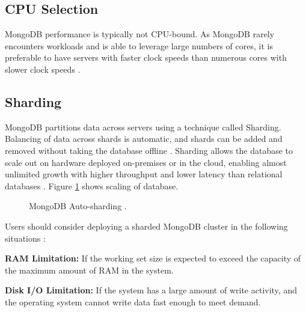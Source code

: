 \documentclass[9pt,twocolumn,twoside]{../../styles/osajnl}
\begin{document}
\subsection {CPU Selection}

MongoDB performance is typically not CPU-bound. As MongoDB rarely encounters workloads and is able to leverage large numbers of cores, it is preferable to have servers with faster clock speeds than numerous cores with slower clock speeds \cite{www-mongo4}.

\subsection {Sharding}

MongoDB partitions data across servers using a technique called Sharding. Balancing of data across shards is automatic, and shards can be added and removed without taking the database offline \cite{www-mongo3}. Sharding allows the database to scale out on hardware deployed on-premises or in the cloud, enabling almost unlimited growth with higher throughput and lower latency than relational databases \cite{www-mongo5}. Figure \ref{fig:figure1} shows scaling of database.

\begin{figure}[htbp]
\centering
{}
\caption{MongoDB Auto-sharding \cite{www-mongo4}.} 
\label{fig:figure1}
\end{figure}

Users should consider deploying a sharded MongoDB cluster in the following situations \cite{www-mongo4}:

{\bfseries RAM Limitation:} If the working set size is expected to exceed the capacity of the maximum amount of RAM in the system.

{\bfseries Disk I/O Limitation:} If the system has a large amount of
write activity, and the operating system cannot write data fast enough
to meet demand.
\end{document}
